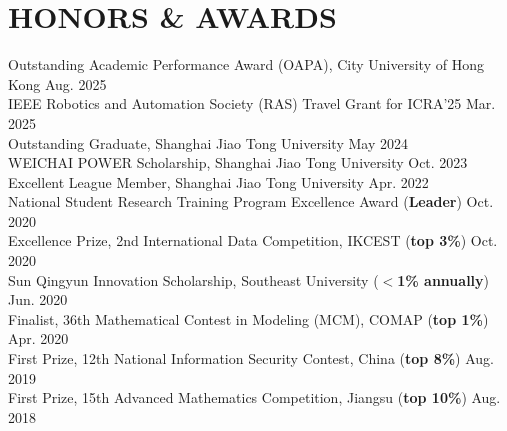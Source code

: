 \documentclass[letterpaper,11pt]{article}
\begin{document}
{{{{{{%
\section{\textbf{HONORS \& AWARDS}}
\vspace{2mm}

\begin{flushleft}
    \normalsize
    {Outstanding Academic Performance Award (OAPA), City University of Hong Kong \cftdotfill{\cftdotsep}Aug. 2025}\\
    \vspace{1mm}
    {IEEE Robotics and Automation Society (RAS) Travel Grant for ICRA'25 \cftdotfill{\cftdotsep}Mar. 2025}\\
    \vspace{1mm}
    {Outstanding Graduate, Shanghai Jiao Tong University \cftdotfill{\cftdotsep}May 2024}\\
    \vspace{1mm}
    {WEICHAI POWER Scholarship, Shanghai Jiao Tong University \cftdotfill{\cftdotsep}Oct. 2023}\\
    \vspace{1mm}
    {Excellent League Member, Shanghai Jiao Tong University \cftdotfill{\cftdotsep}Apr. 2022}\\
    \vspace{1mm}
    {National Student Research Training Program Excellence Award (\textbf{Leader}) \cftdotfill{\cftdotsep}Oct. 2020}\\
    \vspace{1mm}
    {Excellence Prize, 2nd International Data Competition, IKCEST (\textbf{top 3\%}) \cftdotfill{\cftdotsep}Oct. 2020}\\
    \vspace{1mm}
    {Sun Qingyun Innovation Scholarship, Southeast University (\textbf{$<$1\% annually}) \cftdotfill{\cftdotsep}Jun. 2020}\\
    \vspace{1mm}
    {Finalist, 36th Mathematical Contest in Modeling (MCM), COMAP (\textbf{top 1\%}) \cftdotfill{\cftdotsep}Apr. 2020}\\
    \vspace{1mm}
    {First Prize, 12th National Information Security Contest, China (\textbf{top 8\%}) \cftdotfill{\cftdotsep}Aug. 2019}\\
    \vspace{1mm}
    {First Prize, 15th Advanced Mathematics Competition, Jiangsu (\textbf{top 10\%}) \cftdotfill{\cftdotsep}Aug. 2018}
\end{flushleft}



}}}}}}
\end{document}
